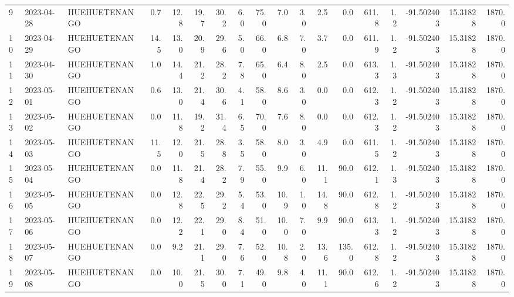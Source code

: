\documentclass[12pt]{article}
\begin{document}
\begin{center}
\begin{tabular}{lllrrrrrrrrrrrrrrr}
9   & 2023-04-28 &  HUEHUETENANGO &     0.7 &  12.8 &   19.7 &  30.2 &      6.0 &     75.0 &        7.0 &  3.0 &         2.5 &         0.0 &      611.8 &        1.2 & -91.502403 &  15.31828 &   1870.0 \\
10  & 2023-04-29 &  HUEHUETENANGO &    14.5 &  13.0 &   20.9 &  29.6 &      5.0 &     66.0 &        6.8 &  7.0 &         3.7 &         0.0 &      611.9 &        1.2 & -91.502403 &  15.31828 &   1870.0 \\
11  & 2023-04-30 &  HUEHUETENANGO &     1.0 &  14.4 &   21.2 &  28.2 &      7.8 &     65.0 &        6.4 &  8.0 &         2.5 &         0.0 &      613.3 &        1.3 & -91.502403 &  15.31828 &   1870.0 \\
12  & 2023-05-01 &  HUEHUETENANGO &     0.6 &  13.0 &   21.4 &  30.6 &      4.1 &     58.0 &        8.6 &  3.0 &         0.0 &         0.0 &      612.3 &        1.2 & -91.502403 &  15.31828 &   1870.0 \\
13  & 2023-05-02 &  HUEHUETENANGO &     0.0 &  11.8 &   19.2 &  31.4 &      6.5 &     70.0 &        7.6 &  8.0 &         0.0 &         0.0 &      612.3 &        1.2 & -91.502403 &  15.31828 &   1870.0 \\
14  & 2023-05-03 &  HUEHUETENANGO &    11.5 &  12.0 &   21.5 &  28.8 &      3.5 &     58.0 &        8.0 &  3.0 &         4.9 &         0.0 &      611.5 &        1.2 & -91.502403 &  15.31828 &   1870.0 \\
15  & 2023-05-04 &  HUEHUETENANGO &     0.0 &  11.8 &   21.4 &  28.2 &      7.9 &     55.0 &        9.9 &  6.0 &        11.1 &        90.0 &      612.1 &        1.3 & -91.502403 &  15.31828 &   1870.0 \\
16  & 2023-05-05 &  HUEHUETENANGO &     0.0 &  12.8 &   22.5 &  29.2 &      5.4 &     53.0 &       10.9 &  1.0 &        14.8 &        90.0 &      612.8 &        1.2 & -91.502403 &  15.31828 &   1870.0 \\
17  & 2023-05-06 &  HUEHUETENANGO &     0.0 &  12.2 &   22.1 &  29.0 &      8.4 &     51.0 &       10.0 &  7.0 &         9.9 &        90.0 &      613.3 &        1.2 & -91.502403 &  15.31828 &   1870.0 \\
18  & 2023-05-07 &  HUEHUETENANGO &     0.0 &   9.2 &   21.1 &  29.0 &      7.6 &     52.0 &       10.8 &  2.0 &        13.6 &       135.0 &      612.8 &        1.2 & -91.502403 &  15.31828 &   1870.0 \\
19  & 2023-05-08 &  HUEHUETENANGO &     0.0 &  10.0 &   21.5 &  30.0 &      7.1 &     49.0 &        9.8 &  4.0 &        11.1 &        90.0 &      612.6 &        1.2 & -91.502403 &  15.31828 &   1870.0 \\

\end{tabular}
\end{center}
\end{document}
